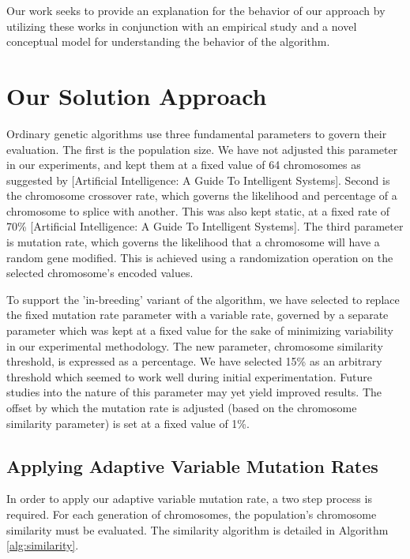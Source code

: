 \documentclass{sig-alternate}
\begin{document}
Our work seeks to provide an explanation for the behavior of our approach by utilizing these works in conjunction with an empirical study and a novel conceptual model for understanding the behavior of the algorithm.

% 
%
\section{Our Solution Approach}\label{params}
Ordinary genetic algorithms use three fundamental parameters to govern their evaluation. The first is the population size. We have not adjusted this parameter in our experiments, and kept them at a fixed value of 64 chromosomes as suggested by [Artificial Intelligence: A Guide To Intelligent Systems]. Second is the chromosome crossover rate, which governs the likelihood and percentage of a chromosome to splice with another. This was also kept static, at a fixed rate of 70\% [Artificial Intelligence: A Guide To Intelligent Systems]. The third parameter is mutation rate, which governs the likelihood that a chromosome will have a random gene modified. This is achieved using a randomization operation on the selected chromosome's encoded values. 

To support the 'in-breeding' variant of the algorithm, we have selected to replace the fixed mutation rate parameter with a variable rate, governed by a separate parameter which was kept at a fixed value for the sake of minimizing variability in our experimental methodology. The new parameter, chromosome similarity threshold, is expressed as a percentage. We have selected 15\% as an arbitrary threshold which seemed to work well during initial experimentation. Future studies into the nature of this parameter may yet yield improved results. The offset by which the mutation rate is adjusted (based on the chromosome similarity parameter) is set at a fixed value of 1\%.

\subsection{Applying Adaptive Variable Mutation Rates}
In order to apply our adaptive variable mutation rate, a two step process is required. For each generation of chromosomes, the population's chromosome similarity must be evaluated. The similarity algorithm is detailed in Algorithm \ref{alg:similarity}.  
\end{document}
